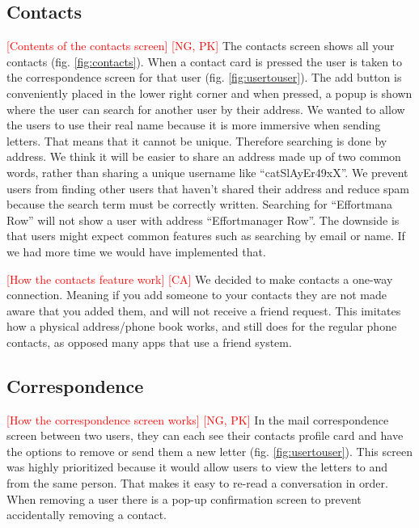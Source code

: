 \documentclass[acmlarge, review=false, screen=true]{acmart}
\begin{document}
    \subsection{Contacts}
      \textcolor{red}{[Contents of the contacts screen] [NG, PK]} \newline
      The contacts screen shows all your contacts (fig. \ref{fig:contacts}). When a contact card is pressed the user is taken to the correspondence screen for that user (fig. \ref{fig:usertouser}). The add button is conveniently placed in the lower right corner and when pressed, a popup is shown where the user can search for another user by their address. We wanted to allow the users to use their real name because it is more immersive when sending letters. That means that it cannot be unique. Therefore searching is done by address. We think it will be easier to share an address made up of two common words, rather than sharing a unique username like “catSlAyEr49xX”. We prevent users from finding other users that haven’t shared their address and reduce spam because the search term must be correctly written. Searching for “Effortmana Row” will not show a user with address “Effortmanager Row”. The downside is that users might expect common features such as searching by email or name. If we had more time we would have implemented that.

      \textcolor{red}{[How the contacts feature work] [CA]} \newline
      We decided to make contacts a one-way connection. Meaning if you add someone to your contacts they are not made aware that you added them, and will not receive a friend request. This imitates how a physical address/phone book works, and still does for the regular phone contacts, as opposed many apps that use a friend system.

    \subsection{Correspondence}
      \textcolor{red}{[How the correspondence screen works] [NG, PK]} \newline
      In the mail correspondence screen between two users, they can each see their contacts profile card and have the options to remove or send them a new letter (fig. \ref{fig:usertouser}). This screen was highly prioritized because it would allow users to view the letters to and from the same person. That makes it easy to re-read a conversation in order. When removing a user there is a pop-up confirmation screen to prevent accidentally removing a contact.
\end{document}
